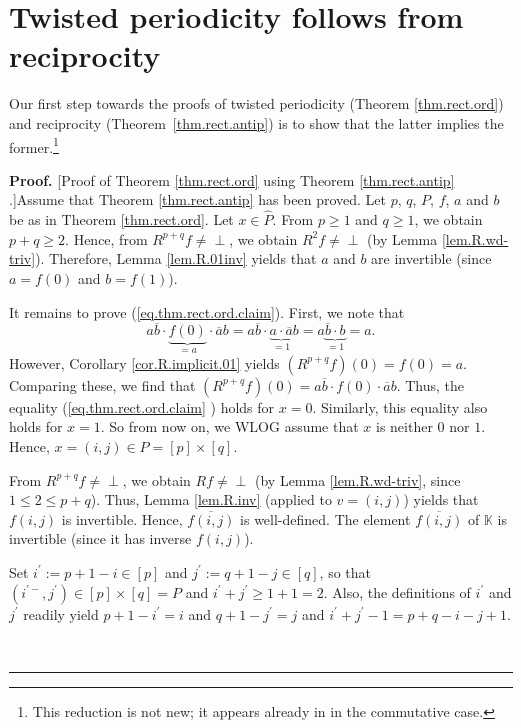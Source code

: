 \documentclass[numbers=enddot,12pt,final,onecolumn,notitlepage]{scrartcl}%
\theoremstyle{definition}
\newenvironment{vershort}{}{}
\newcommand{\undf}{\operatorname*{\bot}}
\newenvironment{proof}[1][Proof]{\noindent\textbf{#1.} }{\ \rule{0.5em}{0.5em}}
\begin{document}
\section{\label{sec.antip-to-ord} Twisted periodicity follows from
reciprocity}

Our first step towards the proofs of twisted periodicity (Theorem
\ref{thm.rect.ord}) and reciprocity (Theorem~\ref{thm.rect.antip}) is to show
that the latter implies the former.\footnote{This reduction is not new; it
appears already in \cite[proof of Corollary 2.12]{MusRob17} in the commutative
case.}

\begin{vershort}
\begin{proof}
[Proof of Theorem \ref{thm.rect.ord} using Theorem \ref{thm.rect.antip}%
.]Assume that Theorem \ref{thm.rect.antip} has been proved. Let $p$, $q$, $P$,
$f$, $a$ and $b$ be as in Theorem \ref{thm.rect.ord}. Let $x\in\widehat{P}$.
From $p\geq1$ and $q\geq1$, we obtain $p+q\geq2$. Hence, from $R^{p+q}%
f\neq\undf$, we obtain $R^{2}f\neq\undf$ (by Lemma \ref{lem.R.wd-triv}).
Therefore, Lemma \ref{lem.R.01inv} yields that $a$ and $b$ are invertible
(since $a=f\left(  0\right)  $ and $b=f\left(  1\right)  $).

It remains to prove (\ref{eq.thm.rect.ord.claim}). First, we note that%
\[
a\overline{b}\cdot\underbrace{f\left(  0\right)  }_{=a}\cdot\overline
{a}b=a\overline{b}\cdot\underbrace{a\cdot\overline{a}}_{=1}%
b=a\underbrace{\overline{b}\cdot b}_{=1}=a.
\]
However, Corollary \ref{cor.R.implicit.01} yields $\left(  R^{p+q}f\right)
\left(  0\right)  =f\left(  0\right)  =a$. Comparing these, we find that
$\left(  R^{p+q}f\right)  \left(  0\right)  =a\overline{b}\cdot f\left(
0\right)  \cdot\overline{a}b$. Thus, the equality (\ref{eq.thm.rect.ord.claim}%
) holds for $x=0$. Similarly, this equality also holds for $x=1$. So from now
on, we WLOG assume that $x$ is neither $0$ nor $1$. Hence, $x = (i,j) \in
P=\left[  p\right]  \times\left[  q\right]  $.

From $R^{p+q}f\neq\undf$, we obtain $Rf\neq\undf$ (by Lemma
\ref{lem.R.wd-triv}, since $1\leq2\leq p+q$). Thus, Lemma \ref{lem.R.inv}
(applied to $v=\left(  i,j\right)  $) yields that $f\left(  i,j\right)  $ is
invertible. Hence, $\overline{f\left(  i,j\right)  }$ is well-defined. The
element $\overline{f\left(  i,j\right)  }$ of $\mathbb{K}$ is invertible
(since it has inverse $f\left(  i,j\right)  $).

Set $i^{\prime}:=p+1-i\in\left[  p\right]  $ and $j^{\prime}:=q+1-j \in\left[
q\right]  $, so that $\left(  i^{\prime-},j^{\prime}\right)  \in\left[
p\right]  \times\left[  q\right]  =P$ and $i^{\prime}+j^{\prime}\geq1+1=2$.
Also, the definitions of $i^{\prime}$ and $j^{\prime}$ readily yield
$p+1-i^{\prime}=i$ and $q+1-j^{\prime}=j$ and $i^{\prime}+j^{\prime
}-1=p+q-i-j+1$.


\end{proof}
\end{vershort}
\end{document}
